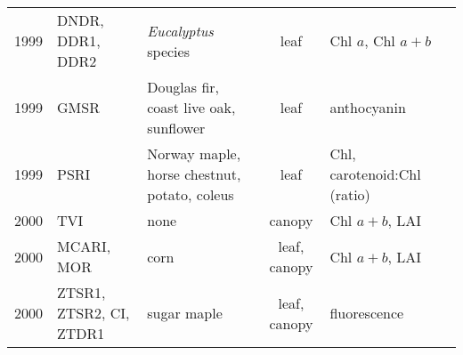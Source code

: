 \documentclass[10pt]{article}
\begin{document}
{\begin{ThreePartTable}
\begin{longtable}{c M{1.5in} M{2.5in} c M{1.5in} M{1.5in}}
  1999 & DNDR, DDR1, DDR2                                & \textit{Eucalyptus} species                                                                                                                                                                                                                           & leaf         & Chl $a$, Chl $a+b$                                                                       & \citet{Datt1999a,Datt1999b}                         \\
  1999 & GMSR                                            & Douglas fir, coast live oak, sunflower                                                                                                                                                                                                                & leaf         & anthocyanin                                                                              & \citet{Gamon1999}                                   \\
  1999 & PSRI                                            & Norway maple, horse chestnut, potato, coleus                                                                                                                                                                                                          & leaf         & Chl, carotenoid:Chl (ratio)                                                              & \citet{Merzlyak1999}                                \\
  2000 & TVI                                             & none                                                                                                                                                                                                                                                  & canopy       & Chl $a+b$, LAI                                                                           & \citet{Broge2000}                                   \\
  2000 & MCARI, MOR                                      & corn                                                                                                                                                                                                                                                  & leaf, canopy & Chl $a+b$, LAI                                                                           & \citet{Daughtry2000}                                \\
  2000 & ZTSR1, ZTSR2, CI, ZTDR1                         & sugar maple                                                                                                                                                                                                                                           & leaf, canopy & fluorescence                                                                             & \citet{Zarco-Tejada2000a,Zarco-Tejada2000b}         \\

\end{longtable}
\end{ThreePartTable}}
\end{document}
